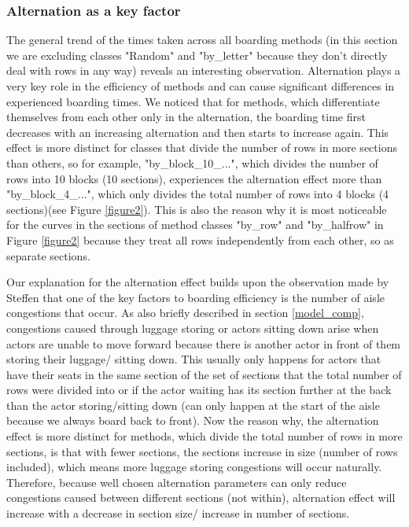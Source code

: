 \documentclass[11pt]{article}
\begin{document}
 
 \subsubsection{Alternation as a key factor}\label{alternation}
 The general trend of the times taken across all boarding methods (in this section we are excluding classes "Random" and "by\_letter" because they don't directly deal with rows in any way) reveals an interesting observation. Alternation plays a very key role in the efficiency of methods and can cause significant differences in experienced boarding times. We noticed that for methods, which differentiate themselves from each other only in the alternation, the boarding time first decreases with an increasing alternation and then starts to increase again.
 This effect is more distinct for classes that divide the number of rows in more sections than others, so for example, "by\_block\_10\_$\dots$", which divides the number of rows into 10 blocks (10 sections), experiences the alternation effect more than "by\_block\_4\_$\dots$", which only divides the total number of rows into 4 blocks (4 sections)(see Figure \ref{figure2}).  This is also the reason why it is most noticeable for the curves in the sections of method classes "by\_row" and "by\_halfrow" in Figure \ref{figure2} because they treat all rows independently from each other, so as separate sections. 
 
 
 Our explanation for the alternation effect builds upon the observation made by Steffen \cite{steffen} that one of the key factors to boarding efficiency is the number of aisle congestions that occur. As also briefly described in section \ref{model_comp}, congestions caused through luggage storing or actors sitting down arise when actors are unable to move forward because there is another actor in front of them storing their luggage/ sitting down. This usually only happens for actors that have their seats in the same section of the set of sections that the total number of rows were divided into or if the actor waiting has its section further at the back than the actor storing/sitting down (can only happen at the start of the aisle because we always board back to front). Now the reason why, the alternation effect is more distinct for methods, which divide the total number of rows in more sections, is that with fewer sections, the sections increase in size (number of rows included), which means more luggage storing congestions will occur naturally. Therefore, because well chosen alternation parameters can only reduce congestions caused between different sections (not within), alternation effect will increase with a decrease in section size/ increase in number of sections.
 
\end{document}
